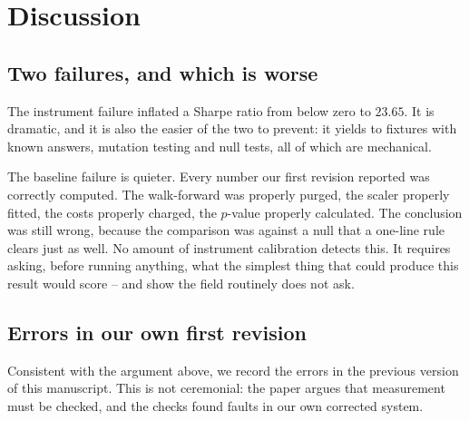 \documentclass[preprint,12pt,authoryear]{elsarticle}
\begin{document}
\section{Discussion}
\label{sec:discussion}

\subsection{Two failures, and which is worse}

The instrument failure inflated a Sharpe ratio from below zero to $23.65$. It is
dramatic, and it is also the easier of the two to prevent: it yields to fixtures
with known answers, mutation testing and null tests, all of which are mechanical.

The baseline failure is quieter. Every number our first revision reported was
correctly computed. The walk-forward was properly purged, the scaler properly
fitted, the costs properly charged, the $p$-value properly calculated. The
conclusion was still wrong, because the comparison was against a null that a
one-line rule clears just as well. No amount of instrument calibration detects
this. It requires asking, before running anything, what the simplest thing that
could produce this result would score -- and \citet{makridakis2018statistical}
show the field routinely does not ask.

\subsection{Errors in our own first revision}
\label{ssec:ourerrors}

Consistent with the argument above, we record the errors in the previous version
of this manuscript. This is not ceremonial: the paper argues that measurement
must be checked, and the checks found faults in our own corrected system.
\end{document}
